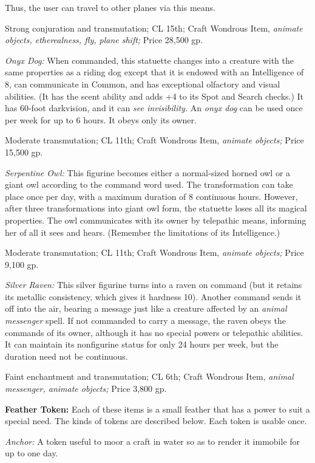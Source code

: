 Thus, the user can travel to other planes via this means.

Strong conjuration and transmutation; CL 15th; Craft Wondrous Item, \textit{animate 
objects, etherealness, fly, plane shift; }Price 28,500 gp.

\textit{Onyx Dog: }When commanded, this statuette changes into a creature with 
the same properties as a riding dog except that it is endowed with an Intelligence 
of 8, can communicate in Common, and has exceptional olfactory and visual abilities. 
(It has the scent ability and adds +4 to its Spot and Search checks.) It has 60-foot 
darkvision, and it can \textit{see invisibility. }An \textit{onyx dog }can be used 
once per week for up to 6 hours. It obeys only its owner.

Moderate transmutation; CL 11th; Craft Wondrous Item, \textit{animate objects; 
}Price 15,500 gp.

\textit{Serpentine Owl: }This figurine becomes either a normal-sized horned owl 
or a giant owl according to the command word used. The transformation can take 
place once per day, with a maximum duration of 8 continuous hours. However, after 
three transformations into giant owl form, the statuette loses all its magical 
properties. The owl communicates with its owner by telepathic means, informing 
her of all it sees and hears. (Remember the limitations of its Intelligence.)

Moderate transmutation; CL 11th; Craft Wondrous Item, \textit{animate objects; 
}Price 9,100 gp.

\textit{Silver Raven: }This silver figurine turns into a raven on command (but 
it retains its metallic consistency, which gives it hardness 10). Another command 
sends it off into the air, bearing a message just like a creature affected by an 
\textit{animal messenger }spell. If not commanded to carry a message, the raven 
obeys the commands of its owner, although it has no special powers or telepathic 
abilities. It can maintain its nonfigurine status for only 24 hours per week, but 
the duration need not be continuous.

Faint enchantment and transmutation; CL 6th; Craft Wondrous Item, \textit{animal 
messenger, animate objects; }Price 3,800 gp.

\textbf{Feather Token:} Each of these items is a small feather that has a power 
to suit a special need. The kinds of tokens are described below. Each token is 
usable once.

\textit{Anchor: }A token useful to moor a craft in water so as to render it immobile 
for up to one day.

